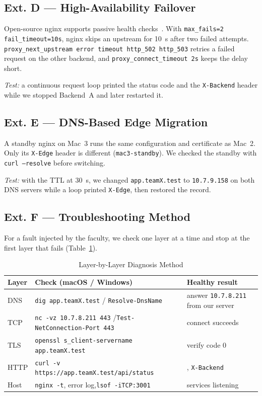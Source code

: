 \documentclass[conference]{IEEEtran}
\newcommand{\ip}[1]{\texttt{#1}}
\begin{document}
\subsection{Ext. D --- High-Availability Failover}
Open-source nginx supports passive health checks~\cite{nginxup}. With \texttt{max\_fails=2 fail\_timeout=10s}, nginx skips an upstream for 10~s after two failed attempts. \texttt{proxy\_next\_upstream error timeout http\_502 http\_503} retries a failed request on the other backend, and \texttt{proxy\_connect\_timeout 2s} keeps the delay short.

\textit{Test:} a continuous request loop printed the status code and the \texttt{X-Backend} header while we stopped Backend~A and later restarted it.

\subsection{Ext. E --- DNS-Based Edge Migration}
A standby nginx on Mac~3 runs the same configuration and certificate as Mac~2. Only its \texttt{X-Edge} header is different (\texttt{mac3-standby}). We checked the standby with \texttt{curl --resolve} before switching.

\textit{Test:} with the TTL at 30~s, we changed \texttt{app.teamX.test} to \ip{10.7.9.158} on both DNS servers while a loop printed \texttt{X-Edge}, then restored the record.

\subsection{Ext. F --- Troubleshooting Method}
For a fault injected by the faculty, we check one layer at a time and stop at the first layer that fails (Table~\ref{tab:method}).

\begin{table}[!t]
\caption{Layer-by-Layer Diagnosis Method}
\label{tab:method}
\centering\scriptsize
\begin{tabularx}{\columnwidth}{@{}>{\raggedright}p{0.8cm}>{\raggedright}X>{\raggedright\arraybackslash}p{1.75cm}@{}}
\toprule
\textbf{Layer} & \textbf{Check (macOS / Windows)} & \textbf{Healthy result} \\
\midrule
DNS & \texttt{dig app.teamX.test} / \texttt{Resolve-DnsName} & answer \ip{10.7.8.211} from our server \\
TCP & \texttt{nc -vz 10.7.8.211 443} /\newline \texttt{Test-NetConnection\newline -Port 443} & connect succeeds \\
TLS & \texttt{openssl s\_client\newline -servername app.teamX.test} & verify code 0 \\
HTTP & \texttt{curl -v https://app.teamX.test\newline /api/status} & 200, \texttt{X-Backend} \\
Host & \texttt{nginx -t}, error log,\newline \texttt{lsof -iTCP:3001} & services listening \\
\bottomrule
\end{tabularx}
\end{table}
\end{document}
